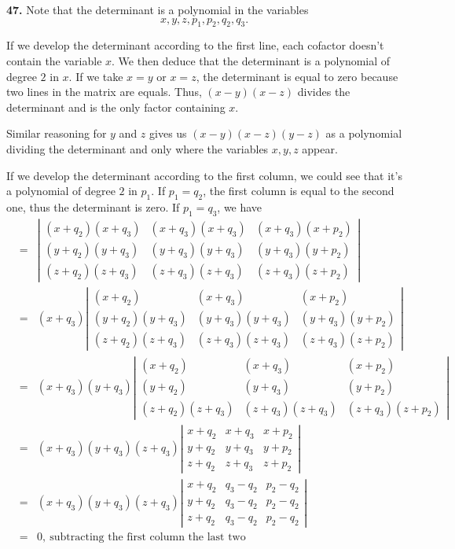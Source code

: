 \documentclass[a4paper,12pt]{article}
\newcommand{\newpar}[1]{\bigskip \noindent \textbf{#1.}}
\begin{document}
\newpar{47}  Note that the determinant is a polynomial in the
variables
\[x, y, z, p_1, p_2, q_2, q_3.\]

If we develop the determinant according to the first line, each
cofactor doesn't contain the variable $x$.  We then deduce that the
determinant is a polynomial of degree $2$ in $x$.  If we take $x = y$
or $x = z$,  the determinant is equal to zero because two lines in the
matrix are equals.  Thus, $(x - y)(x - z)$ divides the determinant and
is the only factor containing $x$.

Similar reasoning for $y$ and $z$ gives us $(x - y)(x - z)(y - z)$ as a
polynomial dividing the determinant and only where the variables $x,
y, z$ appear.

If we develop the determinant according to the first column, we could
see that it's a polynomial of degree $2$ in $p_1$.  If $p_1 = q_2$,
the first column is equal to the second one, thus the determinant is
zero.  If $p_1 = q_3$, we have
\begin{eqnarray*}
  &=& \left|
  \begin{array}{ccc}
    (x+q_2)(x+q_3) & (x+q_3)(x+q_3) & (x+q_3)(x+p_2) \\
    (y+q_2)(y+q_3) & (y+q_3)(y+q_3) & (y+q_3)(y+p_2) \\
    (z+q_2)(z+q_3) & (z+q_3)(z+q_3) & (z+q_3)(z+p_2)
  \end{array}
  \right| \\
  &=& (x+q_3)\left|
  \begin{array}{ccc}
    (x+q_2) & (x+q_3) & (x+p_2) \\
    (y+q_2)(y+q_3) & (y+q_3)(y+q_3) & (y+q_3)(y+p_2) \\
    (z+q_2)(z+q_3) & (z+q_3)(z+q_3) & (z+q_3)(z+p_2)
  \end{array}
  \right| \\
  &=& (x+q_3)(y+q_3)\left|
  \begin{array}{ccc}
    (x+q_2) & (x+q_3) & (x+p_2) \\
    (y+q_2) & (y+q_3) & (y+p_2) \\
    (z+q_2)(z+q_3) & (z+q_3)(z+q_3) & (z+q_3)(z+p_2)
  \end{array}
  \right| \\
  &=& (x+q_3)(y+q_3)(z+q_3)\left|
  \begin{array}{ccc}
    x+q_2 & x+q_3 & x+p_2 \\
    y+q_2 & y+q_3 & y+p_2 \\
    z+q_2 & z+q_3 & z+p_2
  \end{array}
  \right| \\
   &=& (x+q_3)(y+q_3)(z+q_3)\left|
    \begin{array}{ccc}
    x+q_2 & q_3-q_2 & p_2-q_2 \\
    y+q_2 & q_3-q_2 & p_2-q_2 \\
    z+q_2 & q_3-q_2 & p_2-q_2
  \end{array}
    \right|\\
    &=& 0,\ \mbox{subtracting the first column the last two}
\end{eqnarray*}
\end{document}

